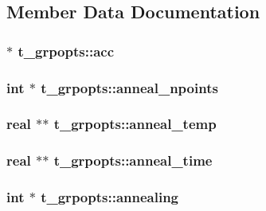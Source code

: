 \subsection{\-Member \-Data \-Documentation}
\hypertarget{structt__grpopts_a559e4541ada72f0fa1eb6876a3078d6c}{
\subsubsection[{acc}]{ $\ast$ {\bf t\-\_\-grpopts\-::acc}}}\label{structt__grpopts_a559e4541ada72f0fa1eb6876a3078d6c}
\hypertarget{structt__grpopts_abbfd7bc3220c8d0c8fa7059c160d08e8}{
\subsubsection[{anneal\-\_\-npoints}]{\setlength{\rightskip}{0pt plus 5cm}int $\ast$ {\bf t\-\_\-grpopts\-::anneal\-\_\-npoints}}}\label{structt__grpopts_abbfd7bc3220c8d0c8fa7059c160d08e8}
\hypertarget{structt__grpopts_a462444c61b4e64c6cf95e7195f52cd19}{
\subsubsection[{anneal\-\_\-temp}]{\setlength{\rightskip}{0pt plus 5cm}real $\ast$$\ast$ {\bf t\-\_\-grpopts\-::anneal\-\_\-temp}}}\label{structt__grpopts_a462444c61b4e64c6cf95e7195f52cd19}
\hypertarget{structt__grpopts_afca94e480d15c0ca4f70d809a44d7151}{
\subsubsection[{anneal\-\_\-time}]{\setlength{\rightskip}{0pt plus 5cm}real $\ast$$\ast$ {\bf t\-\_\-grpopts\-::anneal\-\_\-time}}}\label{structt__grpopts_afca94e480d15c0ca4f70d809a44d7151}
\hypertarget{structt__grpopts_a6d22118a887b255f9a98986c683879d0}{
\subsubsection[{annealing}]{\setlength{\rightskip}{0pt plus 5cm}int $\ast$ {\bf t\-\_\-grpopts\-::annealing}}}\label{structt__grpopts_a6d22118a887b255f9a98986c683879d0}
